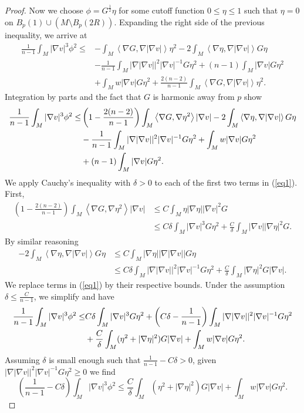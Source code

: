 \documentclass{amsart}
\theoremstyle{definition}
\theoremstyle{remark}
\numberwithin{equation}{section}
\begin{document}
\begin{proof}
Now we choose $\phi = G^{\frac{1}{2}}\eta$ for some cutoff function $0\leq \eta\leq 1$ such that $\eta = 0$ on $B_p(1)\cup (M\setminus B_p(2R))$. Expanding the right side of the previous inequality, we arrive at
\begin{align*}
\frac{1}{n-1}\int_M |\nabla v|^3\phi^2\leq &- \int_M \left<\nabla G, \nabla|\nabla v|\right>\eta^2-2\int_M \left<\nabla \eta, \nabla |\nabla v|\right>G\eta \\
&-\frac{1}{n-1}\int_M |\nabla |\nabla v||^2|\nabla v|^{-1}G\eta^2 + (n-1)\int_M|\nabla v|G\eta^2\\
&+\int_M w|\nabla v| G\eta^2  +\frac{2(n-2)}{n-1}\int_M \left<\nabla G, \nabla|\nabla v|\right> \eta^2.
\end{align*}
Integration by parts and the fact that $G$ is harmonic away from $p$ show
\begin{align}\label{eq1}
\frac{1}{n-1}\int_M |\nabla v|^3\phi^2 \leq &\left(1-\frac{2(n-2)}{n-1}\right)\int_M \left<\nabla G,\nabla\eta^2\right>|\nabla v|-2\int_M\left<\nabla\eta,\nabla |\nabla v|\right>G\eta \notag \\
&-\frac{1}{n-1}\int_M|\nabla |\nabla v||^2|\nabla v|^{-1}G\eta^2+\int_M w|\nabla v| G\eta^2\notag\\
&+ (n-1)\int_M|\nabla v|G\eta^2.  
\end{align}
We apply Cauchy's inequality with $\delta>0$ to each of the first two terms in (\ref{eq1}). First,
\begin{align*}
\left(1-\frac{2(n-2)}{n-1}\right)\int_M \left<\nabla G,\nabla\eta^2\right>|\nabla v|&\leq C\int_M \eta |\nabla \eta||\nabla v|^2 G\\
&\leq C\delta \int_M |\nabla v|^3G\eta^2 + \frac{C}{\delta}\int_M |\nabla v||\nabla \eta|^2 G.
\end{align*}
By similar reasoning
\begin{align*}
-2\int_M\left<\nabla\eta,\nabla |\nabla v|\right>G\eta &\leq C\int_M |\nabla\eta||\nabla|\nabla v|| G\eta \\
&\leq C\delta \int_M |\nabla|\nabla v||^2|\nabla v|^{-1}G\eta^2 +\frac{C}{\delta}\int_M|\nabla\eta|^2G|\nabla v|.
\end{align*}
We replace terms in (\ref{eq1}) by their respective bounds. Under the assumption $\delta\leq \frac{C}{n-1}$, we simplify and have
\begin{align}
\frac{1}{n-1}\int_M|\nabla v|^3\phi^2 \leq& C\delta\int_M |\nabla v|^3G\eta^2 + \left(C\delta - \frac{1}{n-1}\right)\int_M|\nabla |\nabla v||^2|\nabla v|^{-1}G\eta^2 \notag \\
&+ \frac{C}{\delta}\int_M (\eta^2+|\nabla\eta|^2)G|\nabla v|+\int_Mw|\nabla v|G\eta^2.\notag
\end{align}
Assuming $\delta$ is small enough such that $\frac{1}{n-1} - C\delta > 0$, given $|\nabla|\nabla v||^2|\nabla v|^{-1} G\eta^2 \geq 0$ we find
\begin{equation}\label{eq2}\left(\frac{1}{n-1}-C\delta\right)\int_M |\nabla v|^3\phi^2 \leq \frac{C}{\delta}\int_M(\eta^2+|\nabla\eta|^2)G|\nabla v|+\int_M w|\nabla v|G\eta^2.\end{equation}


\end{proof}
\end{document}
